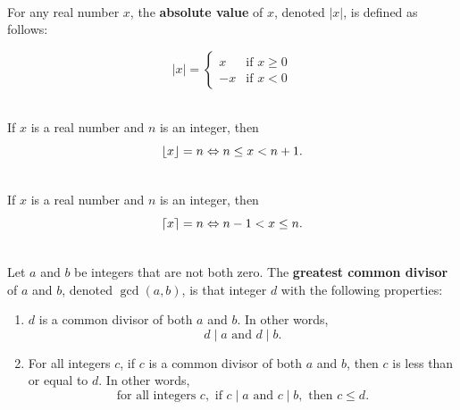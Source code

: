 \documentclass[12pt]{article}
\DeclarePairedDelimiter\ceil{\lceil}{\rceil}
\DeclarePairedDelimiter\floor{\lfloor}{\rfloor}
\begin{document}
\begin{definition}
\hfill\\
\normalfont For any real number $x$, the \textbf{absolute value} of $x$, denoted $|x|$, is defined as follows:

\begin{equation*}
|x|=\begin{cases}
x &\text{if } x\geq 0\\
-x &\text{if } x<0
\end{cases}
\end{equation*}
\end{definition}
\begin{definition}[Floor]
\hfill\\
\normalfont If $x$ is a real number and $n$ is an integer, then
\[ \floor*{x} = n \Leftrightarrow n \leq x < n + 1.\]
\end{definition}
\begin{definition}[Ceiling]
\hfill\\
\normalfont If $x$ is a real number and $n$ is an integer, then
\[ \ceil*{x} = n \Leftrightarrow n - 1 < x \leq n.\]
\end{definition}
\begin{definition}
\hfill\\
\normalfont Let $a$ and $b$ be integers that are not both zero. The \textbf{greatest common divisor} of $a$
and $b$, denoted $\gcd(a, b)$, is that integer $d$ with the following properties:
\begin{enumerate}
\item $d$ is a common divisor of both $a$ and $b$. In other words,
\[d \mid a \text{ and }d \mid b.\]
\item For all integers $c$, if $c$ is a common divisor of both $a$ and $b$, then $c$ is less than or
equal to $d$. In other words,
\[ \text{for all integers } c,\text{ if }c \mid a \text{ and }c \mid b, \text{ then }c \leq d.\]
\end{enumerate}
\end{definition}
\end{document}

